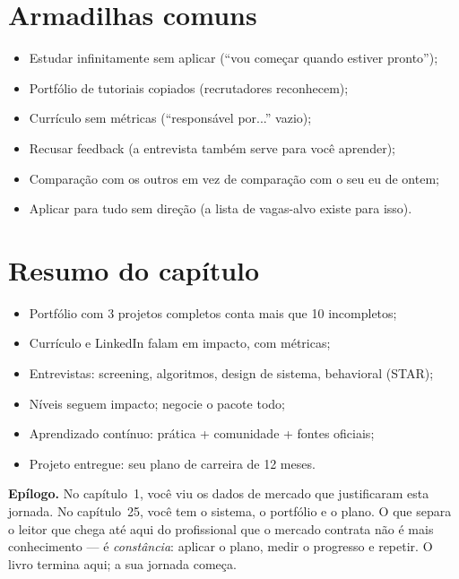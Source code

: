\section{Armadilhas comuns}

\begin{itemize}[leftmargin=*, itemsep=0.4em]
  \item Estudar infinitamente sem aplicar (``vou começar quando estiver pronto'');
  \item Portfólio de tutoriais copiados (recrutadores reconhecem);
  \item Currículo sem métricas (``responsável por...'' vazio);
  \item Recusar feedback (a entrevista também serve para você aprender);
  \item Comparação com os outros em vez de comparação com o seu eu de ontem;
  \item Aplicar para tudo sem direção (a lista de vagas-alvo existe para isso).
\end{itemize}

\section{Resumo do capítulo}

\begin{itemize}[leftmargin=*, itemsep=0.3em]
  \item Portfólio com 3 projetos completos conta mais que 10 incompletos;
  \item Currículo e LinkedIn falam em impacto, com métricas;
  \item Entrevistas: screening, algoritmos, design de sistema, behavioral (STAR);
  \item Níveis seguem impacto; negocie o pacote todo;
  \item Aprendizado contínuo: prática + comunidade + fontes oficiais;
  \item Projeto entregue: seu plano de carreira de 12 meses.
\end{itemize}

\begin{caixaconceito}
\textbf{Epílogo.} No capítulo~1, você viu os dados de mercado que justificaram
esta jornada. No capítulo~25, você tem o sistema, o portfólio e o plano. O
que separa o leitor que chega até aqui do profissional que o mercado contrata
não é mais conhecimento — é \emph{constância}: aplicar o plano, medir o
progresso e repetir. O livro termina aqui; a sua jornada começa.
\end{caixaconceito}

